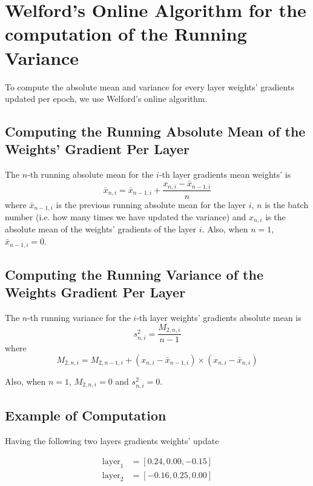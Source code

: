 \documentclass[MSc,english,french]{ulthese}
\begin{document}
\chapter*{Welford's Online Algorithm for the computation of the Running Variance}
To compute the absolute mean and variance for every layer weights' gradients updated per epoch, we use Welford's online algorithm. 

\section*{Computing the Running Absolute Mean of the Weights' Gradient Per Layer}
The $n$-th running absolute mean for the $i$-th layer gradients mean weights' is
\begin{equation*}
\bar{x}_{n, i} = \bar{x}_{n - 1 , i} + \frac{x_{n, i} - \bar{x}_{n - 1, i} }{n}
\end{equation*}	
where $\bar{x}_{n - 1, i}$ is the previous running absolute mean for the layer $i$, $n$ is the batch number (i.e. how many times we have updated the variance) and $x_{n, i}$ is the absolute mean of the weights' gradients of the layer $i$. Also, when $n = 1$, $\bar{x}_{n - 1, i} = 0$.

\section*{Computing the Running Variance of the Weights Gradient Per Layer}
The $n$-th running variance for the $i$-th layer weights' gradients absolute mean is
\begin{equation*}
s^2_{n, i} = \frac{M_{2, n, i}}{n - 1}
\end{equation*}	
where
\begin{equation*}
M_{2, n, i} = M_{2, n- 1, i} + (x_{n, i} - \bar{x}_{n-1, i}) \times (x_{n, i} - \bar{x}_{n, i})
\end{equation*}

Also, when $n = 1$, $M_{2, n, i} = 0$ and $s^2_{n, i} = 0$.

\newpage
\section*{Example of Computation}
Having the following two layers gradients weights' update

\begin{align*}
\text{layer}_1 &= [ 0.24, 0.00, -0.15] \\
\text{layer}_2 &= [-0.16, 0.25, 0.00]
\end{align*}
\end{document}
